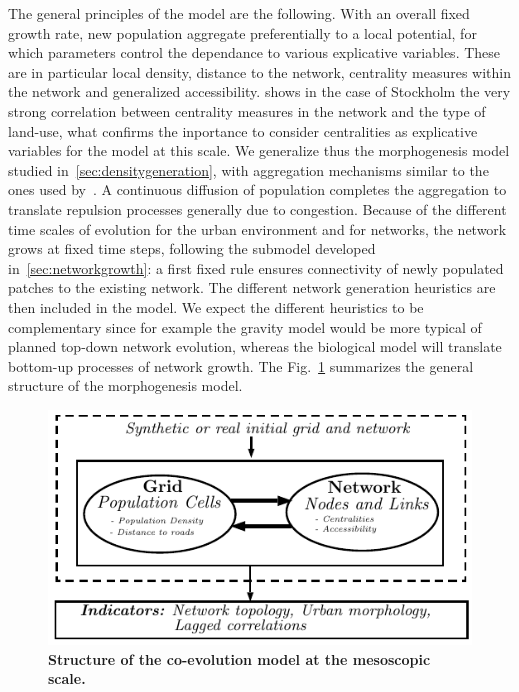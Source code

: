 The general principles of the model are the following. With an overall fixed growth rate, new population aggregate preferentially to a local potential, for which parameters control the dependance to various explicative variables. These are in particular local density, distance to the network, centrality measures within the network and generalized accessibility. \cite{doi:10.1080/13658816.2014.893347} shows in the case of Stockholm the very strong correlation between centrality measures in the network and the type of land-use, what confirms the inportance to consider centralities as explicative variables for the model at this scale. We generalize thus the morphogenesis model studied in~\ref{sec:densitygeneration}, with aggregation mechanisms similar to the ones used by~\cite{raimbault2014hybrid}. A continuous diffusion of population completes the aggregation to translate repulsion processes generally due to congestion. Because of the different time scales of evolution for the urban environment and for networks, the network grows at fixed time steps, following the submodel developed in~\ref{sec:networkgrowth}: a first fixed rule ensures connectivity of newly populated patches to the existing network. The different network generation heuristics are then included in the model. We expect the different heuristics to be complementary since for example the gravity model would be more typical of planned top-down network evolution, whereas the biological model will translate bottom-up processes of network growth. The Fig.~\ref{fig:mesocoevolmodel:workflow} summarizes the general structure of the morphogenesis model.



\begin{figure}
	\includegraphics[width=\linewidth]{figures/mesocoevol.pdf}
	\caption{\textbf{Structure of the co-evolution model at the mesoscopic scale.}\label{fig:mesocoevolmodel:workflow}}
\end{figure}


